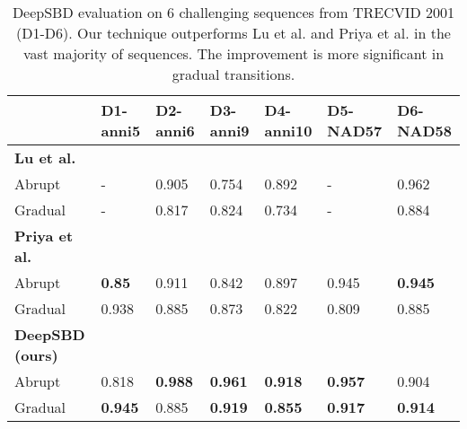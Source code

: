 \documentclass[journal]{IEEEtran}
\begin{document}
\begin{table*}
\small
\centering
\begin{tabular}{|l | l | l | l | l | l| l| }
     \hline      
												                          &   D1-anni5   & D2-anni6  &  D3-anni9    & D4-anni10      & D5-NAD57  & D6-NAD58     \\
     \hline
			 \textbf{Lu et al. \cite{Lu13}}             &        &        &        &         &          &         \\
					Abrupt                                  &   -    & 0.905  &  0.754 &  0.892  &   -      &  0.962 \\
			    Gradual                                 &   -    & 0.817  &  0.824 &  0.734  &   -      &  0.884 \\
			\hline
	    \textbf{Priya et al. \cite{Priya14}}           &        &        &        &         &          &         \\
			   Abrupt                                   &  \textbf{0.85}  & 0.911  &  0.842 &  0.897  &  0.945   &  \textbf{0.945} \\
				 Gradual                                  &  0.938 & 0.885  &  0.873 &  0.822  &  0.809   &  0.885 \\
			\hline 
			\textbf{DeepSBD (ours)}                            &        &        &        &         &          &   \\
				 Abrupt                                   &  0.818 & \textbf{0.988}  & \textbf{0.961}  &  \textbf{0.918}  &  \textbf{0.957}   &  0.904 \\
				 Gradual                                  &  \textbf{0.945} & 0.885  & \textbf{0.919}  &  \textbf{0.855}  &  \textbf{0.917}    &  \textbf{0.914} \\
			\hline
    \end{tabular}\vspace{3pt}
\caption{DeepSBD evaluation on 6 challenging sequences from TRECVID 2001 (D1-D6). Our technique outperforms Lu et al. and Priya et al. \cite{Priya14} in the vast majority of sequences. The improvement is more significant in gradual transitions.}
\label{tab:Ds}
\end{table*}
\end{document}
